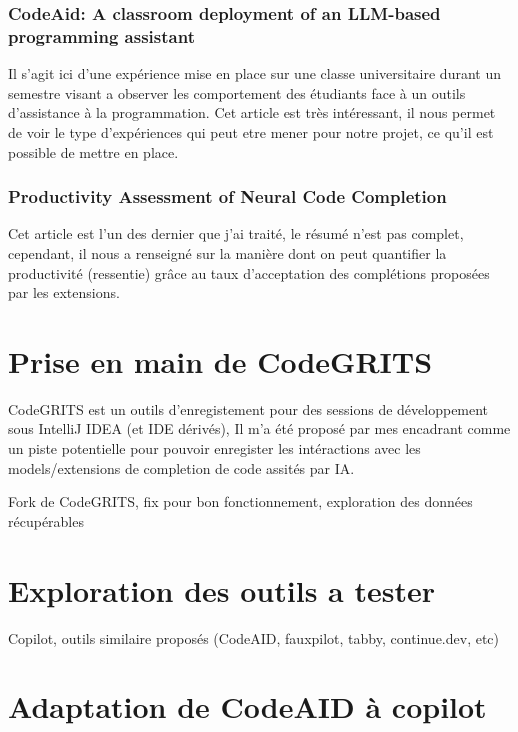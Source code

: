 \subsubsection{CodeAid: A classroom deployment of an LLM-based programming assistant \cite{codeaid}}

Il s'agit ici d'une expérience mise en place sur une classe universitaire durant un semestre visant a observer les comportement des étudiants
face à un outils d'assistance à la programmation.
Cet article est très intéressant, il nous permet de voir le type d'expériences qui peut etre mener pour notre projet, ce qu'il est possible de mettre en place.


\subsubsection{Productivity Assessment of Neural Code Completion \cite{productivity-assess}}

Cet article est l'un des dernier que j'ai traité, le résumé n'est pas complet, cependant, il nous a renseigné sur la manière dont on peut
quantifier la productivité (ressentie) grâce au taux d'acceptation des complétions proposées par les extensions.


\newpage
\section{Prise en main de CodeGRITS}

CodeGRITS est un outils d'enregistement pour des sessions de développement sous IntelliJ IDEA (et IDE dérivés), Il m'a été proposé par mes encadrant comme un
piste potentielle pour pouvoir enregister les intéractions avec les models/extensions de completion de code assités par IA.

Fork de CodeGRITS, fix pour bon fonctionnement, exploration des données récupérables

\section{Exploration des outils a tester}

Copilot, outils similaire proposés (CodeAID, fauxpilot, tabby, continue.dev, etc)

\section{Adaptation de CodeAID à copilot}

